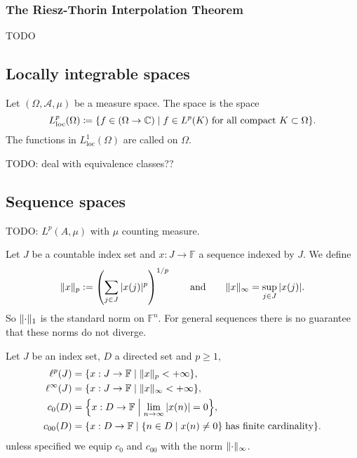 \subsubsection{The Riesz-Thorin Interpolation Theorem}
TODO

\subsection{Locally integrable spaces}
\begin{definition}
Let $(\Omega, \mathcal{A}, \mu)$ be a measure space. The  space is the space
\[ L^p_\text{loc}(\Omega) \defeq \setbuilder{f \in (\Omega\to\C)}{\text{$f\in L^p(K)$ for all compact $K\subset \Omega$}}. \]
The functions in $L^1_\text{loc}(\Omega)$ are called  on $\Omega$.
\end{definition}
TODO: deal with equivalence classes??

\begin{lemma}

\end{lemma}

\subsection{Sequence spaces}
TODO:  $L^p(A,\mu)$ with $\mu$ counting measure.

Let $J$ be a countable index set and $x:J\to \mathbb{F}$ a sequence indexed by $J$. We define
\[ \lVert x\rVert_p := \left(\sum_{j\in J}|x(j)|^p\right)^{1/p} \qquad\text{and}\qquad \lVert x\rVert_\infty = \sup_{j\in J}|x(j)|. \]
So $\lVert\cdot\rVert_1$ is the standard norm on $\mathbb{F}^n$. For general sequences there is no guarantee that these norms do not diverge.
\begin{definition}
Let $J$ be an index set, $D$ a directed set and $p\geq 1$,
\begin{align*}
\ell^p(J) &= \setbuilder{x:J\to \F}{\norm{x}_p < +\infty},\\
\ell^\infty(J) &= \setbuilder{x:J\to \F}{\norm{x}_\infty < +\infty},\\
c_0(D) &= \setbuilder{x:D\to \F}{\lim_{n\to\infty}|x(n)| = 0}, \\
c_{00}(D) &= \setbuilder{x:D\to \F}{\setbuilder{n\in D}{x(n)\neq 0}\;\text{has finite cardinality}}.
\end{align*}
unless specified we equip $c_0$ and $c_{00}$ with the norm $\lVert\cdot\rVert_\infty$.
\end{definition}

